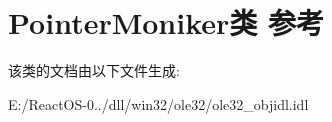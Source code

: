 \hypertarget{class_pointer_moniker}{}\section{Pointer\+Moniker类 参考}
\label{class_pointer_moniker}


该类的文档由以下文件生成\+:\begin{DoxyCompactItemize}
\item 
E\+:/\+React\+O\+S-\/0../dll/win32/ole32/ole32\+\_\+objidl.\+idl\end{DoxyCompactItemize}
